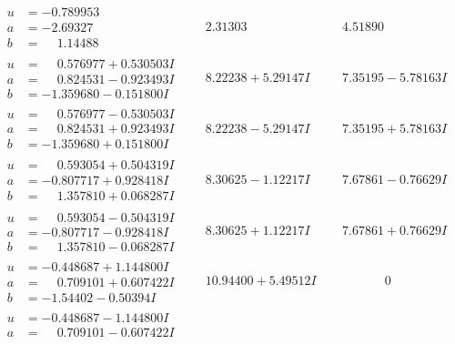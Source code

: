 \documentclass[1p]{elsarticle_modified}
\theoremstyle{definition}
\begin{document}
$$\begin{array}{c|c|c}
\begin{aligned}
u &= -0.789953\phantom{ +0.000000I} \\
a &= -2.69327\phantom{ +0.000000I} \\
b &= \phantom{-}1.14488\phantom{ +0.000000I}\end{aligned}
 & \phantom{-}2.31303\phantom{ +0.000000I} & \phantom{-}4.51890\phantom{ +0.000000I} \\ \hline\begin{aligned}
u &= \phantom{-}0.576977 + 0.530503 I \\
a &= \phantom{-}0.824531 - 0.923493 I \\
b &= -1.359680 - 0.151800 I\end{aligned}
 & \phantom{-}8.22238 + 5.29147 I & \phantom{-}7.35195 - 5.78163 I \\ \hline\begin{aligned}
u &= \phantom{-}0.576977 - 0.530503 I \\
a &= \phantom{-}0.824531 + 0.923493 I \\
b &= -1.359680 + 0.151800 I\end{aligned}
 & \phantom{-}8.22238 - 5.29147 I & \phantom{-}7.35195 + 5.78163 I \\ \hline\begin{aligned}
u &= \phantom{-}0.593054 + 0.504319 I \\
a &= -0.807717 + 0.928418 I \\
b &= \phantom{-}1.357810 + 0.068287 I\end{aligned}
 & \phantom{-}8.30625 - 1.12217 I & \phantom{-}7.67861 - 0.76629 I \\ \hline\begin{aligned}
u &= \phantom{-}0.593054 - 0.504319 I \\
a &= -0.807717 - 0.928418 I \\
b &= \phantom{-}1.357810 - 0.068287 I\end{aligned}
 & \phantom{-}8.30625 + 1.12217 I & \phantom{-}7.67861 + 0.76629 I \\ \hline\begin{aligned}
u &= -0.448687 + 1.144800 I \\
a &= \phantom{-}0.709101 + 0.607422 I \\
b &= -1.54402 - 0.50394 I\end{aligned}
 & \phantom{-}10.94400 + 5.49512 I & \phantom{-0.000000 } 0 \\ \hline\begin{aligned}
u &= -0.448687 - 1.144800 I \\
a &= \phantom{-}0.709101 - 0.607422 I \\

\end{aligned}
\end{array}$$
\end{document}
